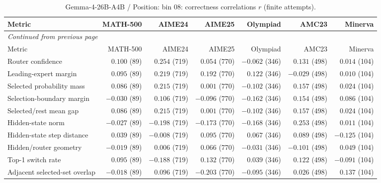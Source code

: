 \begingroup\scriptsize\setlength{\tabcolsep}{4pt}
\begin{longtable}{@{}lrrrrrr@{}}
\caption{Gemma-4-26B-A4B / Position: bin 08: correctness correlations $r$ (finite attempts).}\label{tab:multi-gemma-position-bin_08}\\
\toprule
Metric & MATH-500 & AIME24 & AIME25 & Olympiad & AMC23 & Minerva \\
\midrule\endfirsthead
\multicolumn{7}{l}{\textit{Continued from previous page}}\\
\toprule
Metric & MATH-500 & AIME24 & AIME25 & Olympiad & AMC23 & Minerva \\
\midrule\endhead
\bottomrule\endfoot
Router confidence & $0.100$ (89) & $0.254$ (719) & $0.054$ (770) & $-0.062$ (346) & $0.131$ (498) & $0.014$ (104) \\
Leading-expert margin & $0.095$ (89) & $0.219$ (719) & $0.192$ (770) & $0.122$ (346) & $-0.029$ (498) & $0.010$ (104) \\
Selected probability mass & $0.086$ (89) & $0.215$ (719) & $0.001$ (770) & $-0.102$ (346) & $0.157$ (498) & $0.024$ (104) \\
Selection-boundary margin & $-0.030$ (89) & $0.106$ (719) & $-0.096$ (770) & $-0.162$ (346) & $0.154$ (498) & $0.086$ (104) \\
Selected/rest mean gap & $0.086$ (89) & $0.215$ (719) & $0.001$ (770) & $-0.102$ (346) & $0.157$ (498) & $0.024$ (104) \\
Hidden-state norm & $-0.027$ (89) & $-0.198$ (719) & $-0.173$ (770) & $-0.168$ (346) & $0.253$ (498) & $0.011$ (104) \\
Hidden-state step distance & $0.039$ (89) & $-0.008$ (719) & $0.095$ (770) & $0.067$ (346) & $0.089$ (498) & $-0.125$ (104) \\
Hidden/router geometry & $-0.019$ (89) & $0.006$ (719) & $0.066$ (770) & $-0.031$ (346) & $-0.101$ (498) & $0.049$ (104) \\
Top-1 switch rate & $0.095$ (89) & $-0.188$ (719) & $0.132$ (770) & $0.039$ (346) & $0.122$ (498) & $-0.091$ (104) \\
Adjacent selected-set overlap & $-0.018$ (89) & $0.096$ (719) & $-0.203$ (770) & $-0.095$ (346) & $0.026$ (498) & $0.137$ (104) \\
\end{longtable}\endgroup

